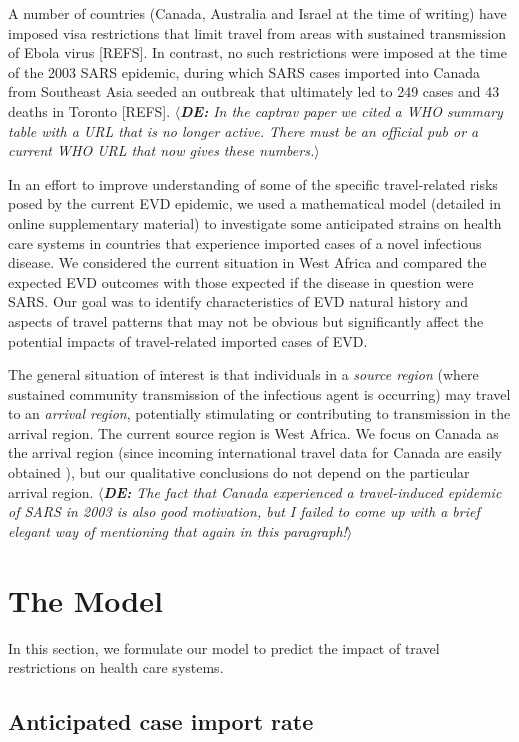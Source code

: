 \documentclass[12pt]{article}
\newcommand{\REFS}{{\color{red}[REFS]}\xspace}
\newcommand{\supp}{online supplementary material\xspace}
\newcommand{\de}[1]{$\langle${\footnotesize{\color{cyan}\slshape{\bfseries DE:} #1}$\rangle$}}
\begin{document}
A number of countries (Canada, Australia and Israel at the time of writing) 
have imposed visa restrictions that limit travel from areas with sustained transmission of Ebola virus \REFS.  In contrast, no such restrictions were imposed at the time of the 2003 SARS epidemic, during which SARS cases imported into Canada from Southeast Asia seeded an outbreak that ultimately led to 249 cases and 43 deaths in Toronto \REFS.
\de{In the captrav paper we cited a WHO summary table with a URL that is no longer active.  There must be an official pub or a current WHO URL that now gives these numbers.}

In an effort to improve understanding of some of the specific travel-related risks posed by the current EVD epidemic, we used a mathematical model (detailed in \supp) to investigate some anticipated strains on health care systems in countries that experience imported cases of a novel infectious disease.  We considered the current situation in West Africa and compared the expected EVD outcomes with those expected if the disease in question were SARS.  Our goal was to identify characteristics of EVD natural history and aspects of travel patterns that may not be obvious but significantly affect the potential impacts of travel-related imported cases of EVD.

The general situation of interest is that individuals in a \emph{source region} (where sustained community transmission of the infectious agent is occurring) may travel to an \emph{arrival region}, potentially stimulating or contributing to transmission in the arrival region.  The current source region is West Africa.  We focus on Canada as the arrival region (since incoming international travel data for Canada are easily obtained \cite{cansim}), but our qualitative conclusions do not depend on the particular arrival region.  \de{The fact that Canada experienced a travel-induced epidemic of SARS in 2003 is also good motivation, but I failed to come up with a brief elegant way of mentioning that again in this paragraph!}

\section{The Model}

In this section, we formulate our model to predict the impact of travel restrictions on health care systems.

\subsection{Anticipated case import rate}
\end{document}
